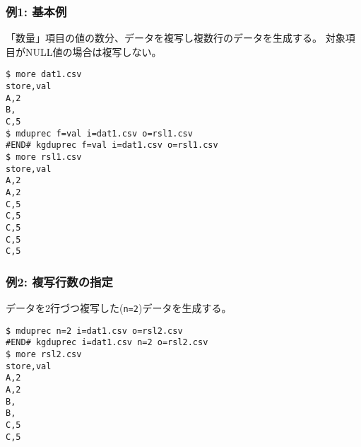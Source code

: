 \subsubsection*{例1: 基本例}

「数量」項目の値の数分、データを複写し複数行のデータを生成する。
対象項目がNULL値の場合は複写しない。


\begin{Verbatim}[baselinestretch=0.7,frame=single]
$ more dat1.csv
store,val
A,2
B,
C,5
$ mduprec f=val i=dat1.csv o=rsl1.csv
#END# kgduprec f=val i=dat1.csv o=rsl1.csv
$ more rsl1.csv
store,val
A,2
A,2
C,5
C,5
C,5
C,5
C,5
\end{Verbatim}
\subsubsection*{例2: 複写行数の指定}

データを2行づつ複写した(\verb|n=2|)データを生成する。


\begin{Verbatim}[baselinestretch=0.7,frame=single]
$ mduprec n=2 i=dat1.csv o=rsl2.csv
#END# kgduprec i=dat1.csv n=2 o=rsl2.csv
$ more rsl2.csv
store,val
A,2
A,2
B,
B,
C,5
C,5
\end{Verbatim}
